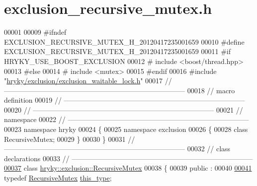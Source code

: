 \hypertarget{exclusion__recursive__mutex_8h_source}{\section{exclusion\-\_\-recursive\-\_\-mutex.\-h}
}

\begin{DoxyCode}
00001 
00009 \textcolor{preprocessor}{#ifndef EXCLUSION\_RECURSIVE\_MUTEX\_H\_20120417235001659}
00010 \textcolor{preprocessor}{}\textcolor{preprocessor}{#define EXCLUSION\_RECURSIVE\_MUTEX\_H\_20120417235001659}
00011 \textcolor{preprocessor}{}\textcolor{preprocessor}{#if HRYKY\_USE\_BOOST\_EXCLUSION}
00012 \textcolor{preprocessor}{}\textcolor{preprocessor}{#   include <boost/thread.hpp>}
00013 \textcolor{preprocessor}{#else}
00014 \textcolor{preprocessor}{}\textcolor{preprocessor}{#   include <mutex>}
00015 \textcolor{preprocessor}{#endif}
00016 \textcolor{preprocessor}{}\textcolor{preprocessor}{#include "\hyperlink{exclusion__waitable__lock_8h}{hryky/exclusion/exclusion_waitable_lock.h}"}
00017 \textcolor{comment}{//
      ------------------------------------------------------------------------------}
00018 \textcolor{comment}{// macro definition}
00019 \textcolor{comment}{//
      ------------------------------------------------------------------------------}
00020 \textcolor{comment}{//
      ------------------------------------------------------------------------------}
00021 \textcolor{comment}{// namespace}
00022 \textcolor{comment}{//
      ------------------------------------------------------------------------------}
00023 \textcolor{keyword}{namespace }hryky
00024 \{
00025 \textcolor{keyword}{namespace }exclusion
00026 \{
00028     \textcolor{keyword}{class }RecursiveMutex;
00029 \}
00030 \}
00031 \textcolor{comment}{//
      ------------------------------------------------------------------------------}
00032 \textcolor{comment}{// class declarations}
00033 \textcolor{comment}{//
      ------------------------------------------------------------------------------}
\hypertarget{exclusion__recursive__mutex_8h_source_l00037}{}\hyperlink{classhryky_1_1exclusion_1_1_recursive_mutex}{00037} \textcolor{comment}{}\textcolor{keyword}{class }\hyperlink{classhryky_1_1exclusion_1_1_recursive_mutex}{hryky::exclusion::RecursiveMutex}
00038 \{
00039 \textcolor{keyword}{public} :
00040 
\hypertarget{exclusion__recursive__mutex_8h_source_l00041}{}\hyperlink{classhryky_1_1exclusion_1_1_recursive_mutex_afc05f6bc3336fc6a5830bd3a7cc9b397}{00041}     \textcolor{keyword}{typedef} \hyperlink{classhryky_1_1exclusion_1_1_recursive_mutex}{RecursiveMutex}          \hyperlink{classhryky_1_1exclusion_1_1_recursive_mutex_afc05f6bc3336fc6a5830bd3a7cc9b397}{this_type};

\end{DoxyCode}
